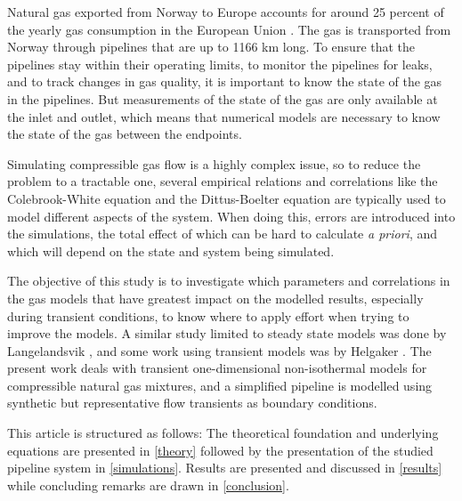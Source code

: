 Natural gas exported from Norway to Europe accounts for around 25 percent of the yearly gas consumption in the European Union%
. The gas is transported from Norway through pipelines that are up to 1166 km long. %
To ensure that the pipelines stay within their operating limits, to monitor the pipelines for leaks, and to track changes in gas quality, %
it is important to know the state of the gas in the pipelines. %
But measurements of the state of the gas are only available at the inlet and outlet, which means that numerical models are necessary to know the state of the gas between the endpoints. 

Simulating compressible gas flow is a highly complex issue, so to reduce the problem to a tractable one, several empirical relations and correlations like the Colebrook-White \cite{Colebrook1939Turbulent} equation and the Dittus-Boelter equation \cite{Winterton1998Where,Dittus1985Heat} are typically used to model different aspects of the system. When doing this, errors are introduced into the simulations, the total effect of which can be hard to calculate \emph{a priori}, and which will depend on the state and system being simulated. 

The objective of this study is to investigate which parameters and correlations in the gas models that have greatest impact on the modelled results, especially during transient conditions, to know where to apply effort when trying to improve the models. A similar study limited to steady state models was done by Langelandsvik \cite{Langelandsvik2008Modeling}, and some work using transient models was by Helgaker \cite{Helgaker2013Modeling}. The present work deals with transient one-dimensional non-isothermal models for compressible natural gas mixtures, and a simplified pipeline is modelled using synthetic but representative flow transients as boundary conditions.

This article is structured as follows: The theoretical foundation and underlying equations are presented in \cref{theory} %
followed by the presentation of the studied pipeline system in \cref{simulations}. Results are presented and discussed in \cref{results} while concluding remarks are drawn in \cref{conclusion}.